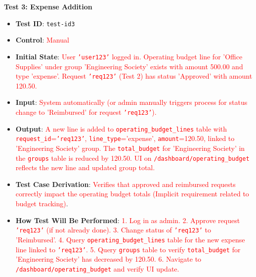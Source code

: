 \documentclass[12pt, titlepage]{article}
\begin{document}
\textbf{Test 3: Expense Addition} \label{test-id3}
\begin{itemize}
    \item \textbf{Test ID}: \texttt{test-id3}
    \item \textbf{Control}: \textcolor{red}{Manual}
    \item \textbf{Initial State}: \textcolor{red}{User \texttt{'user123'} logged in. Operating budget line for 'Office Supplies' under group 'Engineering Society' exists with amount 500.00 and type 'expense'. Request \texttt{'req123'} (Test 2) has status 'Approved' with amount 120.50.}
    \item \textbf{Input}: \textcolor{red}{System automatically (or admin manually triggers process for status change to 'Reimbursed' for request \texttt{'req123'}).}
    \item \textbf{Output}: \textcolor{red}{A new line is added to \texttt{operating\_budget\_lines} table with \texttt{request\_id}=\texttt{'req123'}, \texttt{line\_type}='expense', \texttt{amount}=120.50, linked to 'Engineering Society' group. The \texttt{total\_budget} for 'Engineering Society' in the \texttt{groups} table is reduced by 120.50. UI on \texttt{/dashboard/operating\_budget} reflects the new line and updated group total.}
    \item \textbf{Test Case Derivation}: \textcolor{red}{Verifies that approved and reimbursed requests correctly impact the operating budget totals (Implicit requirement related to budget tracking)}.
    \item \textbf{How Test Will Be Performed}: \textcolor{red}{1. Log in as admin. 2. Approve request \texttt{'req123'} (if not already done). 3. Change status of \texttt{'req123'} to 'Reimbursed'. 4. Query \texttt{operating\_budget\_lines} table for the new expense line linked to \texttt{'req123'}. 5. Query \texttt{groups} table to verify \texttt{total\_budget} for 'Engineering Society' has decreased by 120.50. 6. Navigate to \texttt{/dashboard/operating\_budget} and verify UI update.}
\end{itemize}
\end{document}
